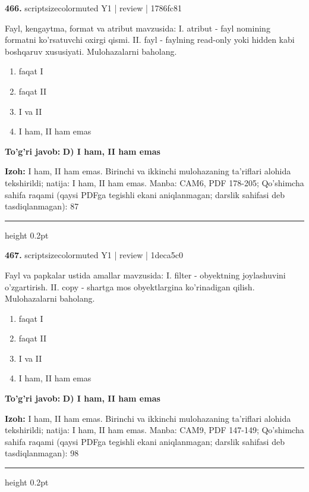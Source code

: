\documentclass[10pt,a4paper]{article}
\begin{document}
{\bfseries\sffamily\color{ink} 466.} {scriptsizecolor{muted} Y1 | review | 1786fc81}
\par
Fayl, kengaytma, format va atribut mavzusida: I. atribut - fayl nomining formatni ko'rsatuvchi oxirgi qismi. II. fayl - faylning read-only yoki hidden kabi boshqaruv xususiyati. Mulohazalarni baholang.
\begin{enumerate}[label=\Alph*),leftmargin=9mm]
\item faqat I
\item faqat II
\item I va II
\item I ham, II ham emas
\end{enumerate}
\begin{tcolorbox}[enhanced,breakable,colback=teal!4,colframe=teal!60!black,boxrule=0.45pt,arc=1.2mm,left=2.7mm,right=2.7mm,top=1.8mm,bottom=1.8mm,before skip=2mm,after skip=2mm]
{\bfseries\sffamily\color{teal}To'g'ri javob:} \textbf{D) I ham, II ham emas}
\par\smallskip
{\bfseries Izoh:} I ham, II ham emas. Birinchi va ikkinchi mulohazaning ta'riflari alohida tekshirildi; natija: I ham, II ham emas. Manba: CAM6, PDF 178-205; Qo'shimcha sahifa raqami (qaysi PDFga tegishli ekani aniqlanmagan; darslik sahifasi deb tasdiqlanmagan): 87
\end{tcolorbox}
\vspace{2mm}\hrule height 0.2pt\vspace{3mm}

{\bfseries\sffamily\color{ink} 467.} {scriptsizecolor{muted} Y1 | review | 1deca5c0}
\par
Fayl va papkalar ustida amallar mavzusida: I. filter - obyektning joylashuvini o'zgartirish. II. copy - shartga mos obyektlargina ko'rinadigan qilish. Mulohazalarni baholang.
\begin{enumerate}[label=\Alph*),leftmargin=9mm]
\item faqat I
\item faqat II
\item I va II
\item I ham, II ham emas
\end{enumerate}
\begin{tcolorbox}[enhanced,breakable,colback=teal!4,colframe=teal!60!black,boxrule=0.45pt,arc=1.2mm,left=2.7mm,right=2.7mm,top=1.8mm,bottom=1.8mm,before skip=2mm,after skip=2mm]
{\bfseries\sffamily\color{teal}To'g'ri javob:} \textbf{D) I ham, II ham emas}
\par\smallskip
{\bfseries Izoh:} I ham, II ham emas. Birinchi va ikkinchi mulohazaning ta'riflari alohida tekshirildi; natija: I ham, II ham emas. Manba: CAM9, PDF 147-149; Qo'shimcha sahifa raqami (qaysi PDFga tegishli ekani aniqlanmagan; darslik sahifasi deb tasdiqlanmagan): 98
\end{tcolorbox}
\vspace{2mm}\hrule height 0.2pt\vspace{3mm}
\end{document}
